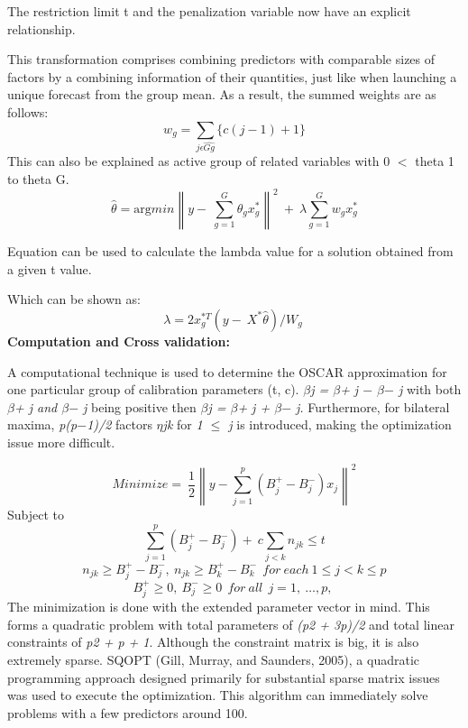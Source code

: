 \documentclass{article} %
\begin{document}
\noindent The restriction limit t and the penalization variable now have an explicit relationship.

\noindent This transformation comprises combining predictors with comparable sizes of factors by a combining information of their quantities, just like when launching a unique forecast from the group mean. As a result, the summed weights are as follows:
\[w_g=\sum_{j\epsilon \widehat{Gg}}{\{c\left(j-1\right)+1\}}\] 
This can also be explained as active group of related variables with 0 $\mathrm{<}$ theta 1 to theta G.
\begin{equation} \label{GrindEQ__16_} 
\widehat{\theta }={\mathrm{arg} min{\left\|y-\ \sum^G_{g=1}{{\theta }_gx^*_g}\right\|}^2\ }+\ \lambda \sum^G_{g=1}{w_gx^*_g} 
\end{equation} 


\noindent Equation can be used to calculate the lambda value for a solution obtained from a given t value.

\noindent Which can be shown as:
\begin{equation} \label{GrindEQ__17_} 
\lambda =2x^{*T}_g(y-\ X^*\widehat{\theta })/W_g\  
\end{equation} 
\textbf{Computation and Cross validation:}

\noindent A computational technique is used to determine the OSCAR approximation for one particular group of calibration parameters (t, c). \textit{$\beta$j = $\beta$+ j $-$ $\beta$$-$ j} with both \textit{$\beta$+ j and $\beta$$-$ j} being positive then \textit{{\textbar}$\beta$j {\textbar} = $\beta$+ j + $\beta$$-$ j.} Furthermore, for bilateral maxima, \textit{p(p$-$1)/2} factors \textit{$\eta$jk} for \textit{1 $\le$ j} is introduced, making the optimization issue more difficult.

\noindent 

\noindent 
\[Minimize=\ \frac{1}{2}{\left\|y-\sum^p_{j=1}{\left(B^+_j-B^-_j\right)x_j}\right\|}^2\] 
Subject to
\[\sum^p_{j=1}{\left(B^+_j-B^-_j\right)+\ c\sum_{j<k}{n_{jk}\le t}}\] 
\[n_{jk}\ge B^+_j-B^-_j,\ n_{jk}\ge B^+_k-B^-_k\ \ for\ each\ 1\le j<k\le p\] 
\begin{equation} \label{GrindEQ__18_} 
B^+_j\ge 0,\ B^-_j\ge 0\ \ for\ all\ \ j=1,\ \dots ,p,\  
\end{equation} 
The minimization is done with the extended parameter vector in mind. This forms a quadratic problem with total parameters of \textit{(p2 + 3p)/2} and total linear constraints of \textit{p2 + p + 1}. Although the constraint matrix is big, it is also extremely sparse. SQOPT (Gill, Murray, and Saunders, 2005), a quadratic programming approach designed primarily for substantial sparse matrix issues was used to execute the optimization. This algorithm can immediately solve problems with a few predictors around 100.
\end{document}
